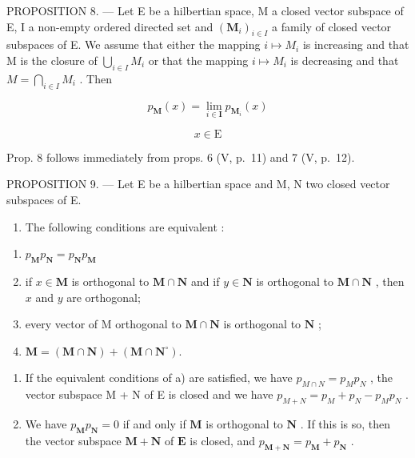 PROPOSITION 8. --- Let E be a hilbertian space, M a closed vector subspace of E, I a non-empty ordered directed set and \((\mathbf{M}_{i})_{i\in I}\) a family of closed vector subspaces of E. We assume that either the mapping \(i\mapsto M_{i}\) is increasing and that M is the closure of \(\bigcup_{i\in I}M_{i}\) or that the mapping \(i\mapsto M_{i}\) is decreasing and that \(M=\bigcap_{i\in I}M_{i}\) . Then

\[
p _ {\mathbf {M}} (x) = \lim _ {i \in \mathbf {I}} p _ {\mathbf {M} _ {i}} (x)
\]

\[
x \in \mathrm{E}
\]

Prop. 8 follows immediately from props. 6 (V, p.~11) and 7 (V, p.~12).

PROPOSITION 9. --- Let E be a hilbertian space and M, N two closed vector subspaces of E.

\begin{enumerate}
\def\labelenumi{\alph{enumi})}
\tightlist
\item
  The following conditions are equivalent :
\end{enumerate}

\begin{enumerate}
\def\labelenumi{(\roman{enumi})}
\item
  \(p_{\mathbf{M}}p_{\mathbf{N}} = p_{\mathbf{N}}p_{\mathbf{M}}\)
\item
  if \(x \in \mathbf{M}\) is orthogonal to \(\mathbf{M} \cap \mathbf{N}\) and if \(y \in \mathbf{N}\) is orthogonal to \(\mathbf{M} \cap \mathbf{N}\) , then \(x\) and \(y\) are orthogonal;
\item
  every vector of M orthogonal to \(\mathbf{M} \cap \mathbf{N}\) is orthogonal to \(\mathbf{N}\) ;
\item
  \(\mathbf{M} = (\mathbf{M}\cap \mathbf{N}) + (\mathbf{M}\cap \mathbf{N}^{\circ}).\)
\end{enumerate}

\begin{enumerate}
\def\labelenumi{\alph{enumi})}
\setcounter{enumi}{1}
\item
  If the equivalent conditions of a) are satisfied, we have \(p_{M \cap N} = p_{M} p_{N}\) , the vector subspace M + N of E is closed and we have \(p_{M + N} = p_{M} + p_{N} - p_{M} p_{N}\) .
\item
  We have \(p_{\mathbf{M}}p_{\mathbf{N}} = 0\) if and only if \(\mathbf{M}\) is orthogonal to \(\mathbf{N}\) . If this is so, then the vector subspace \(\mathbf{M} + \mathbf{N}\) of \(\mathbf{E}\) is closed, and \(p_{\mathbf{M} + \mathbf{N}} = p_{\mathbf{M}} + p_{\mathbf{N}}\) .
\end{enumerate}

